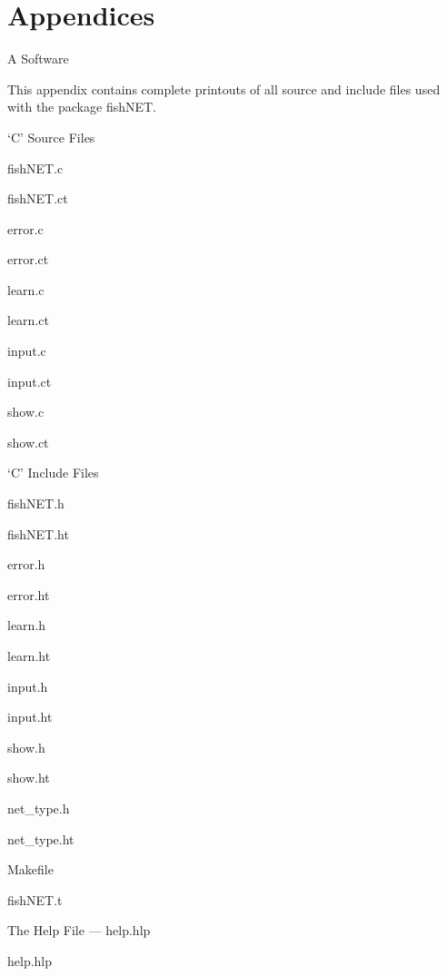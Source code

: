 \part {Appendices} {}

\app A Software

This appendix contains complete printouts of all source and include
files used with the package fishNET.

\sapp `C' Source Files

\ssapp fishNET.c

\listing fishNET.ct

\ssapp error.c

\listing error.ct

\ssapp learn.c

\listing learn.ct

\ssapp input.c

\listing input.ct

\ssapp show.c

\listing show.ct

\sapp `C' Include Files

\ssapp fishNET.h

\listing fishNET.ht

\ssapp error.h

\listing error.ht

\ssapp learn.h

\listing learn.ht

\ssapp input.h

\listing input.ht

\ssapp show.h

\listing show.ht

\ssapp net\_type.h

\listing net_type.ht

\sapp Makefile


\listing fishNET.t

\sapp The Help File --- help.hlp

\listing help.hlp

